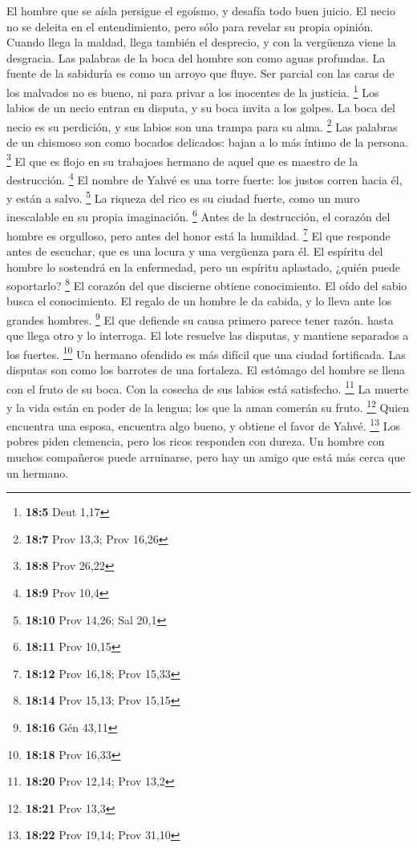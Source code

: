  El hombre que se aísla persigue el egoísmo, y desafía
todo buen juicio.  El necio no se deleita en el
entendimiento, pero sólo para revelar su propia opinión. 
Cuando llega la maldad, llega también el desprecio, y con la vergüenza
viene la desgracia.  Las palabras de la boca del hombre
son como aguas profundas. La fuente de la sabiduría es como un arroyo
que fluye.  Ser parcial con las caras de los malvados no
es bueno, ni para privar a los inocentes de la justicia. \footnote{\textbf{18:5}
  Deut 1,17}  Los labios de un necio entran en disputa, y
su boca invita a los golpes.  La boca del necio es su
perdición, y sus labios son una trampa para su alma. \footnote{\textbf{18:7}
  Prov 13,3; Prov 16,26}  Las palabras de un chismoso son
como bocados delicados: bajan a lo más íntimo de la persona. \footnote{\textbf{18:8}
  Prov 26,22}  El que es flojo en su trabajoes hermano de
aquel que es maestro de la destrucción. \footnote{\textbf{18:9} Prov
  10,4}  El nombre de Yahvé es una torre fuerte: los
justos corren hacia él, y están a salvo. \footnote{\textbf{18:10} Prov
  14,26; Sal 20,1}  La riqueza del rico es su ciudad
fuerte, como un muro inescalable en su propia imaginación. \footnote{\textbf{18:11}
  Prov 10,15}  Antes de la destrucción, el corazón del
hombre es orgulloso, pero antes del honor está la humildad. \footnote{\textbf{18:12}
  Prov 16,18; Prov 15,33}  El que responde antes de
escuchar, que es una locura y una vergüenza para él.  El
espíritu del hombre lo sostendrá en la enfermedad, pero un espíritu
aplastado, ¿quién puede soportarlo? \footnote{\textbf{18:14} Prov 15,13;
  Prov 15,15}  El corazón del que discierne obtiene
conocimiento. El oído del sabio busca el conocimiento. 
El regalo de un hombre le da cabida, y lo lleva ante los grandes
hombres. \footnote{\textbf{18:16} Gén 43,11}  El que
defiende su causa primero parece tener razón. hasta que llega otro y lo
interroga.  El lote resuelve las disputas, y mantiene
separados a los fuertes. \footnote{\textbf{18:18} Prov 16,33}
 Un hermano ofendido es más difícil que una ciudad
fortificada. Las disputas son como los barrotes de una fortaleza.
 El estómago del hombre se llena con el fruto de su boca.
Con la cosecha de sus labios está satisfecho. \footnote{\textbf{18:20}
  Prov 12,14; Prov 13,2}  La muerte y la vida están en
poder de la lengua; los que la aman comerán su fruto. \footnote{\textbf{18:21}
  Prov 13,3}  Quien encuentra una esposa, encuentra algo
bueno, y obtiene el favor de Yahvé. \footnote{\textbf{18:22} Prov 19,14;
  Prov 31,10}  Los pobres piden clemencia, pero los ricos
responden con dureza.  Un hombre con muchos compañeros
puede arruinarse, pero hay un amigo que está más cerca que un hermano.

